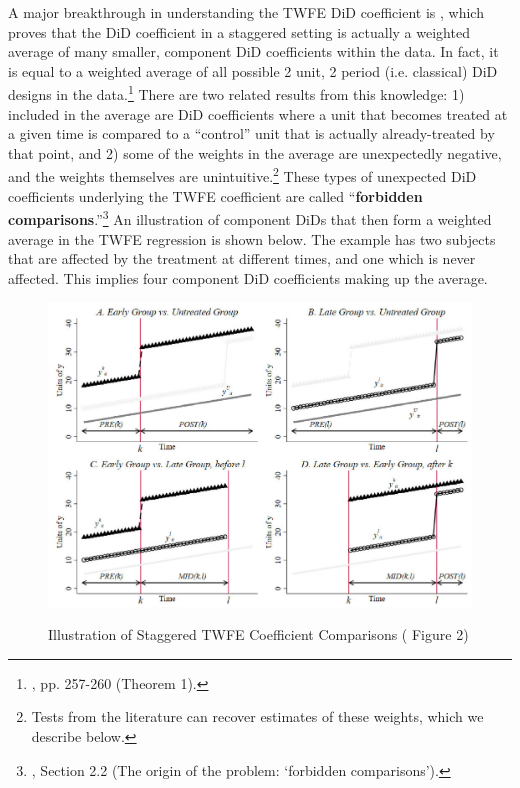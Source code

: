 \documentclass[12pt]{article}
\begin{document}
A major breakthrough in understanding the TWFE DiD coefficient is \citet{goodman-bacon2021a}, which proves that the DiD coefficient in a staggered setting is actually a weighted average of many smaller, component DiD coefficients within the data. In fact, it is equal to a weighted average of all possible 2 unit, 2 period (i.e. classical) DiD designs in the data.\footnote{\citet{goodman-bacon2021a}, pp. 257-260 (Theorem 1).}  There are two related results from this knowledge: 1) included in the average are DiD coefficients where a unit that becomes treated at a given time is compared to a “control” unit that is actually already-treated by that point, and 2) some of the weights in the average are unexpectedly negative, and the weights themselves are unintuitive.\footnote{Tests from the literature can recover estimates of these weights, which we describe below.} These types of unexpected DiD coefficients underlying the TWFE coefficient are called “\textbf{forbidden comparisons}.”\footnote{\citet{de2023two}, Section 2.2 (The origin of the problem: ‘forbidden comparisons’).}  An illustration of component DiDs that then form a weighted average in the TWFE regression is shown below. The example has two subjects that are affected by the treatment at different times, and one which is never affected. This implies four component DiD coefficients making up the average.
\begin{figure}[H]
    \centering
    \caption{Illustration of Staggered TWFE Coefficient Comparisons (\citet{goodman-bacon2021a} Figure 2)}
    \includegraphics[width=6in]{Figures/Goodman-Bacon (2021) Figure 2.PNG}
    \label{fig:AGB-fig2}
\end{figure}
\end{document}
